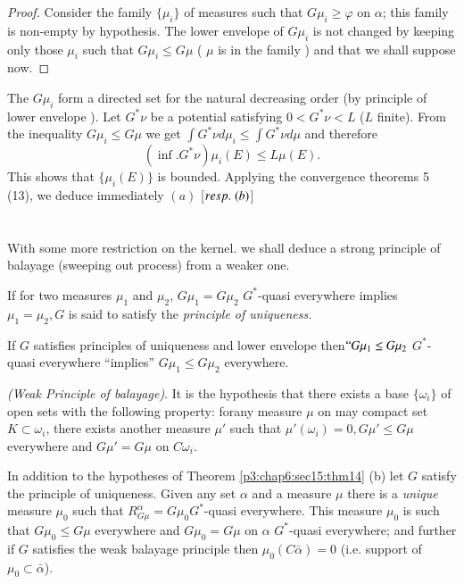 \begin{proof}
  Consider the family $\big \{\mu_i \big \} $ of measures such that $G
  \mu_i \geq \varphi$ on $\alpha$; this family is non-empty by
  hypothesis. The lower envelope of  $G \mu_i$ is not changed by
  keeping only those $\mu_i$ such that $ G \mu_i \leq G \mu $ ( $ \mu
  $ is in the family ) and that we shall suppose now. 
\end{proof}


The $G \mu_i$ form a directed set for the natural decreasing order (by
principle of lower envelope ). Let $ G^* \nu $ be a potential
satisfying $ 0 < G^* \nu < L $ ($ L$ finite). From the inequality  $ G
\mu_i \leq G \mu $ we get $ \int G^* \nu d \mu_i \leq \int G^* \nu d
\mu $ and therefore  
$$
(\inf. G^* \nu ) \mu_i (E) \leq L \mu (E). 
$$
This shows that $\big \{ \mu_i (E) \big \}$ is bounded. Applying  the
convergence theorems 5 (13), we deduce immediately $(a)$ [$
  {resp.}\kern.3em (b)$] 

\section{}\label{p3:chap6:sec16}%

With some more restriction on the kernel. we shall deduce a strong
principle of balayage (sweeping out process) from a weaker one.  

\begin{defn}\label{p3:chap6:sec16:def20} %
  If for two measures $ \mu_1$ and $ \mu_2 $, $ G \mu_1 = G \mu_2$
  $G^*$-quasi everywhere implies $ \mu_1 = \mu_2,  G$ is said  to
  satisfy the {\em principle of uniqueness.} 
\end{defn}

If $G$ satisfies principles of uniqueness and lower envelope then\break $``G
\mu_1 \leq G \mu_2$ $G^* $-quasi everywhere ``implies'' $G \mu_1 \leq G
\mu_2 $ everywhere. 

\begin{defn}\label{p3:chap6:sec16:def21} %
  {\em (Weak Principle of balayage)}. It is the hypothesis that there
  exists a base $ \big \{ \omega_i \big \} $ of open sets with the
  following property: for\pageoriginale any measure $\mu$ on may compact set $ K
  \subset \omega_i $, there exists another measure $ \mu'$ such that $
  \mu' (\omega_i) = 0,   G \mu' \leq G \mu $ everywhere and $ G \mu'
  = G \mu $ on $ C \omega_i $. 
\end{defn}

\begin{thm}\label{p3:chap6:sec16:thm15} %
  In addition to the hypotheses of Theorem \ref{p3:chap6:sec15:thm14}
  (b) let $G$ satisfy the 
  principle of uniqueness. Given any set $\alpha$ and a measure $\mu$
  there is a {\em unique} measure $\mu_0$ such that $ R^\alpha_{G
    \mu} = G \mu_0 G^* $-quasi everywhere. This measure $\mu_0$ is
  such that $ G \mu_0 \leq G \mu $ everywhere and $ G \mu_0 = G \mu $
  on $\alpha$ $G^*$-quasi everywhere; and further if $G$ satisfies
  the weak balayage principle then  $ \mu_0 (C \bar{\alpha}) = 0 $
  (i.e.  support of $ \mu_0 \subset \bar{\alpha}$). 
\end{thm}

